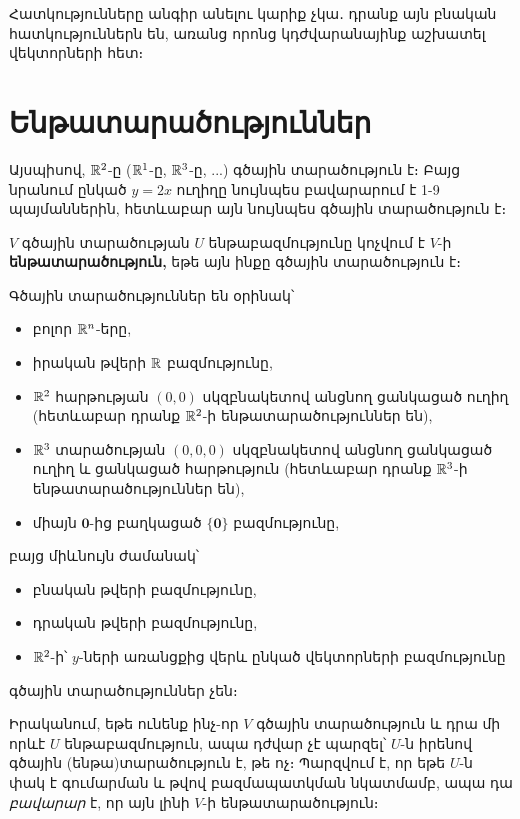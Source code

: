 Հատկությունները անգիր անելու կարիք չկա․ դրանք այն բնական հատկություններն են, առանց որոնց կդժվարանայինք աշխատել վեկտորների հետ։


\section{Ենթատարածություններ}


Այսպիսով, $\mathbb{R}^2$-ը ($\mathbb{R}^1$-ը, $\mathbb{R}^3$-ը, ...) գծային տարածություն է։ Բայց նրանում ընկած $y=2x$ ուղիղը նույնպես բավարարում է 1-9 պայման\-նե\-րին, հետևաբար այն նույնպես գծային տարածություն է։ 

\begin{definition}
$V$ գծային տարածության $U$ ենթաբազմությունը կոչվում է $V$-ի \textbf{ենթատարածություն,} եթե այն ինքը գծային տարածություն է։
\end{definition}

\begin{example} 
Գծային տարածություններ են օրինակ՝
\begin{itemize}
\item բոլոր $\mathbb{R}^n$-երը,

\item իրական թվերի $\mathbb{R}$ բազմությունը,

\item $\mathbb{R}^2$ հարթության $(0, 0)$ սկզբնակետով անցնող ցանկացած ուղիղ (հետևաբար դրանք $\mathbb{R}^2$-ի ենթատարածություններ են),

\item $\mathbb{R}^3$ տարածության $(0, 0, 0)$ սկզբնակետով անցնող ցանկացած ուղիղ և ցանկացած հարթություն (հետևաբար դրանք $\mathbb{R}^3$-ի ենթա\-տարածու\-թյուններ են),


\item միայն $\mathbf{0}$-ից բաղկացած $\{\mathbf{0}\}$ բազմությունը,
\end{itemize}
բայց միևնույն ժամանակ՝
\begin{itemize}
\item բնական թվերի բազմությունը,

\item դրական թվերի բազմությունը,

\item $\mathbb{R}^2$-ի՝ $y$-ների առանցքից վերև ընկած վեկտորների բազմությունը
\end{itemize}
գծային տարածություններ չեն։
\end{example}

Իրականում, եթե ունենք ինչ-որ $V$ գծային տարածություն և դրա մի որևէ $U$ ենթաբազմություն, ապա դժվար չէ պարզել՝ $U$-ն իրենով գծային (ենթա)տարածություն է, թե ոչ։ Պարզվում է, որ եթե $U$-ն փակ է գումարման և թվով բազմապատկման նկատմամբ, ապա դա \textit{բավարար} է, որ այն լինի $V$-ի ենթատարածություն։ 

